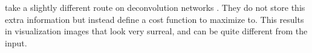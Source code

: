   \citeauthor{mahendran_understanding_2015} take a slightly different route on
  deconvolution networks \citep{mahendran_understanding_2015}. They do not
  store this extra information but instead define a cost function to maximize
  to. This results in visualization images that look very surreal, and can be
  quite different from the input.



